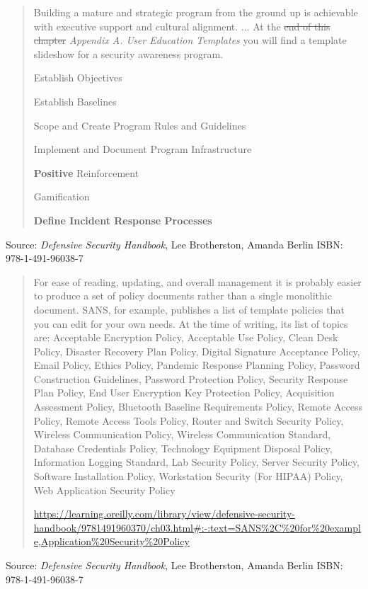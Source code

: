 \documentclass[Screen16to9,17pt]{foils}
\begin{document}


\begin{quote}
Building a mature and strategic program from the ground up is achievable with executive support and cultural alignment. ...  At the \sout{end of this chapter} \emph{Appendix A. User Education Templates} you will find a template slideshow for a security awareness program.

\begin{list2}
\item Establish Objectives
\item Establish Baselines
\item Scope and Create Program Rules and Guidelines
\item Implement and Document Program Infrastructure
\item {\bf Positive} Reinforcement
\item Gamification
\item {\bf Define Incident Response Processes}
\end{list2}
\end{quote}
Source: \emph{Defensive Security Handbook}, Lee Brotherston, Amanda Berlin ISBN: 978-1-491-96038-7







\begin{quote}
For ease of reading, updating, and overall management it is probably easier to produce a set of policy documents rather than a single monolithic document.
SANS, for example, publishes a list of template policies that you can edit for your own needs. At the time of writing, its list of topics are: {\small
Acceptable Encryption Policy,
Acceptable Use Policy,
Clean Desk Policy,
Disaster Recovery Plan Policy,
Digital Signature Acceptance Policy,
Email Policy,
Ethics Policy,
Pandemic Response Planning Policy,
Password Construction Guidelines,
Password Protection Policy,
Security Response Plan Policy,
End User Encryption Key Protection Policy,
Acquisition Assessment Policy,
Bluetooth Baseline Requirements Policy,
Remote Access Policy,
Remote Access Tools Policy,
Router and Switch Security Policy,
Wireless Communication Policy,
Wireless Communication Standard,
Database Credentials Policy,
Technology Equipment Disposal Policy,
Information Logging Standard,
Lab Security Policy,
Server Security Policy,
Software Installation Policy,
Workstation Security (For HIPAA) Policy,
Web Application Security Policy}

{\scriptsize\url{https://learning.oreilly.com/library/view/defensive-security-handbook/9781491960370/ch03.html#:-:text=SANS%2C%20for%20example,Application%20Security%20Policy}}
\end{quote}
Source: \emph{Defensive Security Handbook}, Lee Brotherston, Amanda Berlin ISBN: 978-1-491-96038-7
\end{document}
